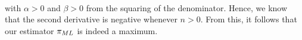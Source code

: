 {\begin{align*}
\end{align*}
with $\alpha > 0$ and $\beta > 0$ from the squaring of the denominator. Hence, we know that the second derivative is negative whenever $n > 0$.
From this, it follows that our estimator $\pi_{ML}$ is indeed a maximum.


}
